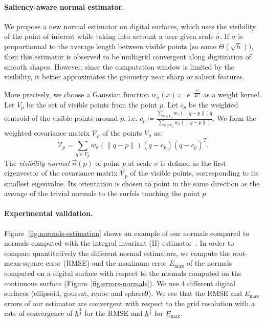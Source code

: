 \newcommand{\Kernel}[1]{\ensuremath{w_{\sigma}(#1)}}

\paragraph{Saliency-aware normal estimator.}
We propose a new normal estimator on digital surfaces, which uses
the visibility of the point of interest while taking into account
a user-given scale $\sigma$. If $\sigma$ is proportionnal to the
average length between visible points (so some
$\Theta\left(\sqrt{h}\right)$), then this estimator is observed to be
multigrid convergent along digitization of smooth shapes. However,
since the computation window is limited by the visibility, it
better approximates the geometry near sharp or salient features.

More precisely, we choose a Gaussian function
$\Kernel{x}\coloneqq e^{-\frac{x^2}{2\sigma^2}}$ as a weight kernel. Let
$V_p$ be the set of visible points from the point $p$. Let $c_p$
be the weighted centroid of the visible points around $p$,
i.e. $c_p \coloneqq \frac{\sum_{q \in V_p} \Kernel{\|q-p\|}q}{\sum_{q \in
V_p} \Kernel{\|q-p\|}}$. We form the weighted covariance matrix
$\mathcal{V}_p$ of the points $V_p$ as:
\begin{equation}
    \mathcal{V}_p = \sum_{q \in V_p} \Kernel{\|q-p\|}(q - c_p)(q - c_p)^T.
\end{equation}
The \emph{visibility normal} $\vec{n}(p)$ of point $p$ at scale $\sigma$ is defined
as the first eigenvector of the covariance matrix $\mathcal{V}_p$
of the visible points, corresponding to its smallest
eigenvalue. Its orientation is chosen to point in the same
direction as the average of the trivial normals to the surfels
touching the point $p$.

\paragraph{Experimental validation.}
Figure~\ref{fig:normals-estimation} shows an example
of our normals compared to normals computed with the integral invariant (II) estimator~\cite{Lachaud:2017-lnm}.
In order to compare quantitatively the different normal estimators, we compute the
root-mean-square error (RMSE) and the maximum error $E_{\max}$ of the
normals computed on a digital surface with respect to the normals computed
on the continuous surface (Figure~\ref{fig:errors-normals}). We use 4 different digital surfaces (ellipsoid,
goursat, rcube and sphere9). We see that the RMSE and $E_{\max}$ errors of our
estimator are convergent with respect to the grid resolution with a
rate of convergence of $h^{\frac{2}{3}}$ for the RMSE and $h^{\frac{1}{2}}$ for
$E_{\max}$.

